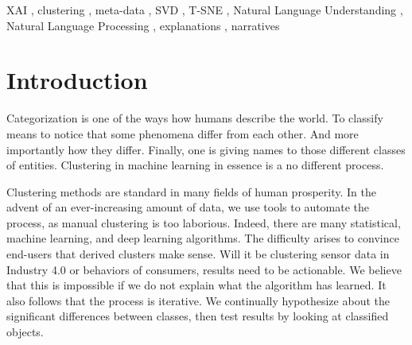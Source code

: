 \documentclass[
 twocolumn,
]{ceurart}
\begin{document}
\begin{keywords}
  XAI \sep
  clustering \sep
  meta-data \sep
  SVD \sep
  T-SNE \sep
  Natural Language Understanding \sep
  Natural Language Processing \sep
  explanations \sep
  narratives
\end{keywords}

\maketitle

\section{Introduction}
Categorization is one of the ways how humans describe the world.
To classify means to notice that some phenomena differ from each other.
And more importantly how they differ.
Finally, one is giving names to those different classes of entities.
Clustering in machine learning in essence is a no different process.

Clustering methods are standard in many fields of human prosperity.
In the advent of an ever-increasing amount of data, we use tools to automate the process, as manual clustering is too laborious.
Indeed, there are many statistical, machine learning, and deep learning algorithms.
The difficulty arises to convince end-users that derived clusters make sense.
Will it be clustering sensor data in Industry 4.0 or behaviors of consumers, results need to be actionable.
We believe that this is impossible if we do not explain what the algorithm has learned. %
It also follows that the process is iterative.
We continually hypothesize about the significant differences between classes, then test results by looking at classified objects.
\end{document}
